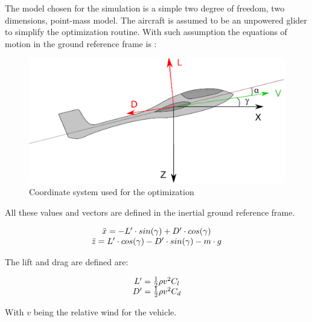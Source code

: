
The model chosen for the simulation is a simple two degree of freedom, two dimensions, point-mass model. 
The aircraft is assumed to be an unpowered glider to simplify the optimization routine. 
With such assumption the equations of motion in the ground reference frame is :

\begin{figure}[h]
  \centering
  \includegraphics{./Figures/glider.eps}
  \caption{Coordinate system used for the optimization}
\end{figure}

All these values and vectors are defined in the inertial ground reference frame.

\begin{equation}
\begin{array}[c]{c}
  \ddot{x}= -L' \cdot sin(\gamma) + D' \cdot cos(\gamma) \\ 
  \ddot{z}= L' \cdot cos(\gamma) - D' \cdot sin(\gamma) - m \cdot g
\end{array}
\label{eqn:eqm}
\end{equation}



\par The lift and drag are defined are: 

\begin{equation}
\begin{array}[c]{c}
  L'= \frac{1}{2} \rho v^2 C_l \\ 
  D'= \frac{1}{2} \rho v^2 C_d 
\end{array}
\label{eqn:Cl_def}
\end{equation}

\par With $v$ being the relative wind for the vehicle.

